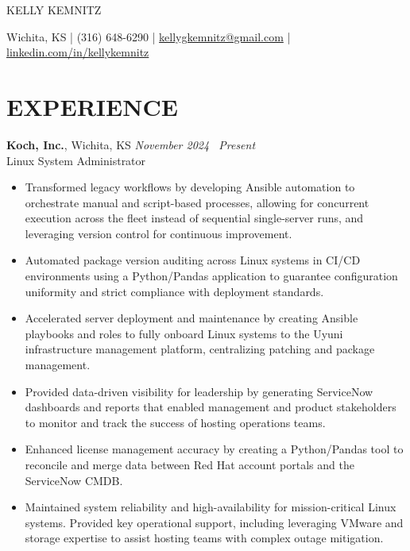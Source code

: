 \documentclass[10pt,letterpaper]{article}       %
\begin{document}
\centerline{\LARGE KELLY KEMNITZ}
\medskip

\centerline{\large Wichita, KS | (316) 648-6290 | \href{mailto:kellygkemnitz@gmail.com}{kellygkemnitz@gmail.com} | \href{https://www.linkedin.com/in/kellykemnitz/}{linkedin.com/in/kellykemnitz}}

\vspace{-10pt}

\section*{EXPERIENCE}
\textbf{Koch, Inc.}, Wichita, KS \hfill \textit{November 2024 \textendash\ Present} \\
\vspace{1pt}
Linux System Administrator \\
\begin{itemize}
  \item Transformed legacy workflows by developing Ansible automation to orchestrate manual and script-based processes, allowing for concurrent execution across the fleet instead of sequential single-server runs, and leveraging version control for continuous improvement.
  \item Automated package version auditing across Linux systems in CI/CD environments using a Python/Pandas application to guarantee configuration uniformity and strict compliance with deployment standards.
  \item Accelerated server deployment and maintenance by creating Ansible playbooks and roles to fully onboard Linux systems to the Uyuni infrastructure management platform, centralizing patching and package management.
  \item Provided data-driven visibility for leadership by generating ServiceNow dashboards and reports that enabled management and product stakeholders to monitor and track the success of hosting operations teams.
  \item Enhanced license management accuracy by creating a Python/Pandas tool to reconcile and merge data between Red Hat account portals and the ServiceNow CMDB.
  \item Maintained system reliability and high-availability for mission-critical Linux systems. Provided key operational support, including leveraging VMware and storage expertise to assist hosting teams with complex outage mitigation.
\end{itemize}
\end{document}
